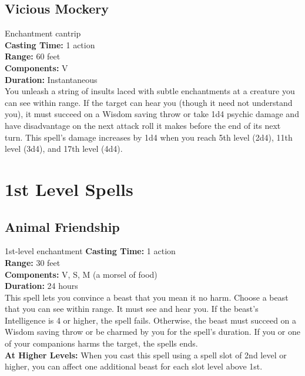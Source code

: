 \documentclass[11pt, A4paper, english]{article}
\begin{document}
		\subsection{Vicious Mockery}
Enchantment cantrip \\
\textbf{Casting Time:} 1 action \\
\textbf{Range:} 60 feet \\
\textbf{Components:} V \\
\textbf{Duration:} Instantaneous \\
You unleash a string of insults laced with subtle enchantments at a creature you can see within range. If the target can hear you (though it need not understand you), it must succeed on a Wisdom saving throw or take 1d4 psychic damage and have disadvantage on the next attack roll it makes before the end of its next turn. This spell’s damage increases by 1d4 when you reach 5th level (2d4), 11th level (3d4), and 17th level (4d4).



	\section{1st Level Spells}
		\subsection{Animal Friendship}
1st-level enchantment
\textbf{Casting Time:} 1 action \\
\textbf{Range:} 30 feet \\
\textbf{Components:} V, S, M (a morsel of food) \\
\textbf{Duration:} 24 hours \\
This spell lets you convince a beast that you mean it no harm. Choose a beast that you can see within range. It must see and hear you. If the beast’s Intelligence is 4 or higher, the spell fails. Otherwise, the beast must succeed on a Wisdom saving throw or be charmed by you for the spell’s duration. If you or one of your companions harms the target, the spells ends. \\
\textbf{At Higher Levels:} When you cast this spell using a spell slot of 2nd level or higher, you can affect one additional beast for each slot level above 1st.
\end{document}
